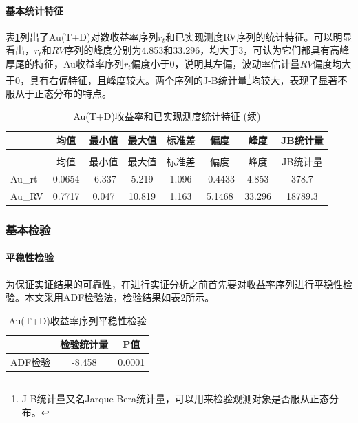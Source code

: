 \documentclass[UTF8,a4paper,12pt]{ctexart}  %
\begin{document}
\hypertarget{section-12}{%
\paragraph{基本统计特征}\label{section-12}}

表\ref{tab:Aucharacteristics}列出了Au(T+D)对数收益率序列\(r_t\)和已实现测度RV序列的统计特征。可以明显看出，\(r_t\)和\(RV\)序列的峰度分别为4.853和33.296，均大于3，可认为它们都具有高峰厚尾的特征，Au收益率序列\(r_t\)偏度小于0，说明其左偏，波动率估计量\(RV\)偏度均大于0，具有右偏特征，且峰度较大。两个序列的J-B统计量\footnote{J-B统计量又名Jarque-Bera统计量，可以用来检验观测对象是否服从正态分布。}均较大，表现了显著不服从于正态分布的特点。

\begin{longtable}[t]{lccccccc}
\caption{\label{tab:Aucharacteristics}Au(T+D)收益率和已实现测度统计特征}\\
\toprule
  & 均值 & 最小值 & 最大值 & 标准差 & 偏度 & 峰度 & JB统计量\\
\midrule
\endfirsthead
\caption[]{\label{tab:Aucharacteristics}Au(T+D)收益率和已实现测度统计特征 (续)}\\
\toprule
  & 均值 & 最小值 & 最大值 & 标准差 & 偏度 & 峰度 & JB统计量\\
\midrule
\endhead

\endfoot
\bottomrule
\endlastfoot
Au\_rt & 0.0654 & -6.337 & 5.219 & 1.096 & -0.4433 & 4.853 & 378.7\\
Au\_RV & 0.7717 & 0.047 & 10.819 & 1.163 & 5.1468 & 33.296 & 18789.3\\*
\end{longtable}

\hypertarget{section-13}{%
\subsubsection{基本检验}\label{section-13}}

\hypertarget{section-14}{%
\paragraph{平稳性检验}\label{section-14}}

为保证实证结果的可靠性，在进行实证分析之前首先要对收益率序列进行平稳性检验。本文采用ADF检验法，检验结果如表\ref{tab:Au-adf}所示。

\begin{longtable}[t]{lcc}
\caption{\label{tab:Au-adf}Au(T+D)收益率序列平稳性检验}\\
\toprule
  & 检验统计量 & P值\\
\midrule
ADF检验 & -8.458 & 0.0001\\
\bottomrule
\end{longtable}
\end{document}

